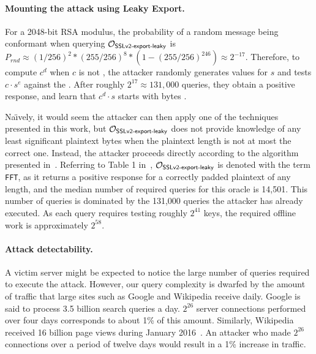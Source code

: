 \paragraph{Mounting the attack using Leaky Export.}
For a 2048-bit RSA modulus, the probability of a random message being conformant
when querying $\mathcal{O}_\textsf{SSLv2-export-leaky}$ is
$P_{rnd} \approx (1/256)^2 * (255/256)^{8} * (1 - (255/256)^{246}) \approx 2^{-17}$.
Therefore, to compute $c^d$ when $c$ is not \sslconform,
the attacker randomly generates values for $s$ and tests
$c \cdot s^{e}$ against the \tOracleSSLleaky.
After roughly $2^{17} \approx 131,000$ queries, they obtain a positive response,
and learn that $c^d \cdot s$ starts with bytes .

Na\"{\i}vely, it would seem the attacker can then apply one of the techniques
presented in this work, but $\mathcal{O}_\textsf{SSLv2-export-leaky}$ does not provide knowledge of
any least significant plaintext bytes when the plaintext length is not 
at most the correct one.
Instead, the attacker proceeds directly according to the algorithm presented
in~\cite{bardou2012efficient}.
Referring to Table 1 in~\cite{bardou2012efficient},
$\mathcal{O}_\textsf{SSLv2-export-leaky}$ is denoted with the term \texttt{FFT},
as it returns a positive response for a correctly padded plaintext of any length,
and the median number of required queries for this oracle is 14,501.
This number of queries is dominated by the 131,000 queries the attacker has already executed.
As each query requires testing roughly $2^{41}$ keys, the required offline work is
approximately $2^{58}$.

\ifext
\paragraph{Attack detectability.}

A victim server might be expected to notice the large number of queries required to execute the attack.  However, our query complexity is dwarfed by the amount of traffic that large sites such as Google and Wikipedia receive daily.  
Google is said to process 3.5 billion search queries a day.
$2^{26}$ server connections performed over four days corresponds to about 1\% of this amount.
Similarly, Wikipedia received 16 billion page views during January 2016~\cite{WikipediaStats}.
An attacker who made $2^{26}$ connections over a period of twelve days would result in a 1\% increase in traffic.
\fi

